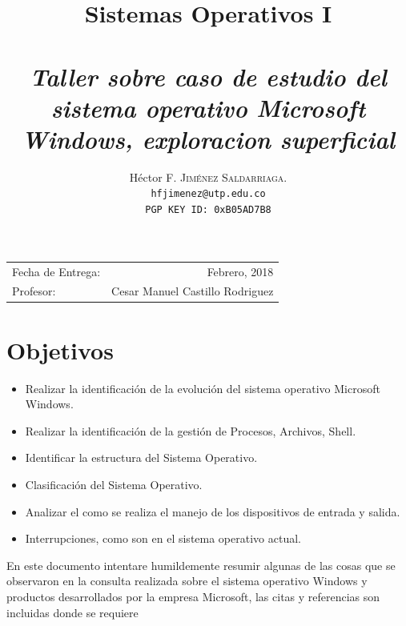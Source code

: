 \documentclass[paper=a4, fontsize=12pt]{article} 		%
\title{Sistemas Operativos I\\ 
\horrule{0.5pt} \\[0.4cm] 								%
\textit{Taller sobre caso de estudio del sistema operativo Microsoft Windows, exploracion superficial}
\horrule{1pt} \\[0.5cm] 			
}
\author{												
Héctor F. \textsc{Jiménez Saldarriaga.}\\				%
\texttt{hfjimenez@utp.edu.co} \\						
\texttt{PGP KEY ID: 0xB05AD7B8}
}
\date{}    						                       %
\numberwithin{equation}{section}						%
\numberwithin{table}{section} 							%
\begin{document}
\maketitle                      			           %
\begin{center}
\begin{tabular}{l r}								   %
Fecha de Entrega: & Febrero, 2018 \\				   %
Profesor: & Cesar Manuel Castillo Rodriguez
\end{tabular}
\end{center}
\section{Objetivos}
\begin{itemize}
    \item Realizar la identificación de la evolución del sistema operativo Microsoft Windows.
    \item Realizar la identificación de la gestión de Procesos, Archivos, Shell.
    \item Identificar la estructura del Sistema Operativo.
    \item Clasificación del Sistema Operativo.
    \item Analizar el como se realiza el manejo de los dispositivos de entrada y salida.
    \item Interrupciones, como son en el sistema operativo actual. 
\end{itemize}
En este documento intentare humildemente resumir algunas de las cosas que se observaron en la consulta realizada sobre el sistema operativo Windows y productos desarrollados por la empresa Microsoft, las citas y referencias son incluidas donde se requiere 
\end{document}
